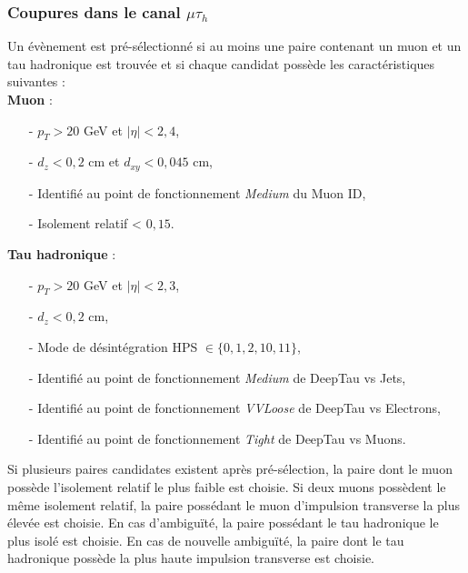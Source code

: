 \subsubsection{ Coupures dans le canal $\mu\tau_h$}

Un évènement est pré-sélectionné si au moins une paire contenant un muon et un tau hadronique est trouvée et si chaque candidat possède les caractéristiques suivantes : \\

\textbf{Muon} :

\begin{itemize}
\bigskip
    \item[-] $p_{T}>20$ GeV et $|\eta|<2,4$,
        \smallskip
    \item[-] $d_z<0,2$ cm et $d_{xy}<0,045$ cm,
        \smallskip
    \item[-] Identifié au point de fonctionnement \textit{Medium} du Muon ID,
        \smallskip
    \item[-] Isolement relatif < $0,15$. 
    \bigskip
\end{itemize}

\textbf{Tau hadronique} :

\begin{itemize}
\bigskip
    \item[-] $p_{T}>20$ GeV et $|\eta|<2,3$,
        \smallskip
    \item[-] $d_z<0,2$ cm,
        \smallskip
    \item[-] Mode de désintégration HPS $\in\{0,1,2,10,11\}$,
        \smallskip
    \item[-] Identifié au point de fonctionnement \textit{Medium} de DeepTau vs Jets,
        \smallskip
    \item[-] Identifié au point de fonctionnement \textit{VVLoose} de DeepTau vs Electrons,
    \item[-] Identifié au point de fonctionnement \textit{Tight} de DeepTau vs Muons. 
    \bigskip
\end{itemize}

Si plusieurs paires candidates existent après pré-sélection, la paire dont le muon possède l'isolement relatif le plus faible est choisie. Si deux muons possèdent le même isolement relatif, la paire possédant le muon d'impulsion transverse la plus élevée est choisie. En cas d'ambiguïté, la paire possédant le tau hadronique le plus isolé est choisie. En cas de nouvelle ambiguïté, la paire dont le tau hadronique possède la plus haute impulsion transverse est choisie. \\

